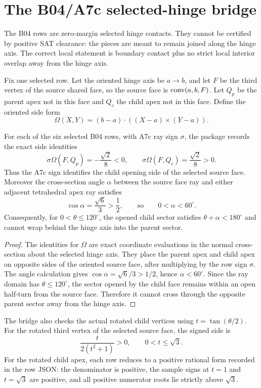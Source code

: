 \section{The B04/A7c selected-hinge bridge}
\label{sec:b04}

The B04 rows are zero-margin selected hinge contacts.  They cannot be certified
by positive SAT clearance: the pieces are meant to remain joined along the
hinge axis.  The correct local statement is boundary contact plus no strict
local interior overlap away from the hinge axis.

Fix one selected row.  Let the oriented hinge axis be \(a\to b\), and let
\(F\) be the third vertex of the source shared face, so the source face is
\(\operatorname{conv}(a,b,F)\).  Let \(Q_p\) be the parent apex not in this face and \(Q_c\)
the child apex not in this face.  Define the oriented side form
\[
\Omega(X,Y)=(b-a)\cdot((X-a)\times(Y-a)).
\]

\begin{lemma}
\label{lem:wedge}
For each of the six selected B04 rows, with A7c ray sign \(\sigma\), the package
records the exact side identities
\[
\sigma\Omega(F,Q_p)=-\frac{\sqrt2}{8}<0,
\qquad
\sigma\Omega(F,Q_c)=\frac{\sqrt2}{8}>0.
\]
Thus the A7c sign identifies the child opening side of the selected source
face.  Moreover the cross-section angle \(\alpha\) between the source face ray
and either adjacent tetrahedral apex ray satisfies
\[
\cos\alpha=\frac{\sqrt6}{3}>\frac{1}{2},
\qquad\text{so}\qquad
0<\alpha<60^\circ.
\]
Consequently, for \(0<\theta\le120^\circ\), the opened child sector satisfies
\(\theta+\alpha<180^\circ\) and cannot wrap behind the hinge axis into the
parent sector.
\end{lemma}

\begin{proof}
The identities for \(\Omega\) are exact coordinate evaluations in the normal
cross-section about the selected hinge axis.  They place the parent apex and
child apex on opposite sides of the oriented source face, after multiplying by
the row sign \(\sigma\).  The angle calculation gives
\(\cos\alpha=\sqrt6/3>1/2\), hence \(\alpha<60^\circ\).  Since the ray domain
has \(\theta\le120^\circ\), the sector opened by the child face remains within
an open half-turn from the source face.  Therefore it cannot cross through the
opposite parent sector away from the hinge axis.
\end{proof}

The bridge also checks the actual rotated child vertices using
\(t=\tan(\theta/2)\).  For the rotated third vertex of the selected source face,
the signed side is
\[
\frac{t}{2(t^2+1)}>0,
\qquad 0<t\le\sqrt3.
\]
For the rotated child apex, each row reduces to a positive rational form
recorded in the row JSON: the denominator is positive, the sample signs at
\(t=1\) and \(t=\sqrt3\) are positive, and all positive numerator roots lie
strictly above \(\sqrt3\).

